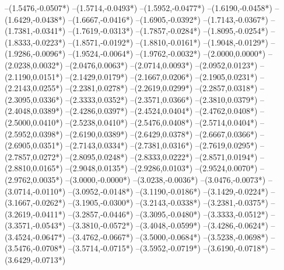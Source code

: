 {	--(1.5476,{-0.0507*\yskala})
	--(1.5714,{-0.0493*\yskala})
	--(1.5952,{-0.0477*\yskala})
	--(1.6190,{-0.0458*\yskala})
	--(1.6429,{-0.0438*\yskala})
	--(1.6667,{-0.0416*\yskala})
	--(1.6905,{-0.0392*\yskala})
	--(1.7143,{-0.0367*\yskala})
	--(1.7381,{-0.0341*\yskala})
	--(1.7619,{-0.0313*\yskala})
	--(1.7857,{-0.0284*\yskala})
	--(1.8095,{-0.0254*\yskala})
	--(1.8333,{-0.0223*\yskala})
	--(1.8571,{-0.0192*\yskala})
	--(1.8810,{-0.0161*\yskala})
	--(1.9048,{-0.0129*\yskala})
	--(1.9286,{-0.0096*\yskala})
	--(1.9524,{-0.0064*\yskala})
	--(1.9762,{-0.0032*\yskala})
	--(2.0000,{0.0000*\yskala})
	--(2.0238,{0.0032*\yskala})
	--(2.0476,{0.0063*\yskala})
	--(2.0714,{0.0093*\yskala})
	--(2.0952,{0.0123*\yskala})
	--(2.1190,{0.0151*\yskala})
	--(2.1429,{0.0179*\yskala})
	--(2.1667,{0.0206*\yskala})
	--(2.1905,{0.0231*\yskala})
	--(2.2143,{0.0255*\yskala})
	--(2.2381,{0.0278*\yskala})
	--(2.2619,{0.0299*\yskala})
	--(2.2857,{0.0318*\yskala})
	--(2.3095,{0.0336*\yskala})
	--(2.3333,{0.0352*\yskala})
	--(2.3571,{0.0366*\yskala})
	--(2.3810,{0.0379*\yskala})
	--(2.4048,{0.0389*\yskala})
	--(2.4286,{0.0397*\yskala})
	--(2.4524,{0.0404*\yskala})
	--(2.4762,{0.0408*\yskala})
	--(2.5000,{0.0410*\yskala})
	--(2.5238,{0.0410*\yskala})
	--(2.5476,{0.0408*\yskala})
	--(2.5714,{0.0404*\yskala})
	--(2.5952,{0.0398*\yskala})
	--(2.6190,{0.0389*\yskala})
	--(2.6429,{0.0378*\yskala})
	--(2.6667,{0.0366*\yskala})
	--(2.6905,{0.0351*\yskala})
	--(2.7143,{0.0334*\yskala})
	--(2.7381,{0.0316*\yskala})
	--(2.7619,{0.0295*\yskala})
	--(2.7857,{0.0272*\yskala})
	--(2.8095,{0.0248*\yskala})
	--(2.8333,{0.0222*\yskala})
	--(2.8571,{0.0194*\yskala})
	--(2.8810,{0.0165*\yskala})
	--(2.9048,{0.0135*\yskala})
	--(2.9286,{0.0103*\yskala})
	--(2.9524,{0.0070*\yskala})
	--(2.9762,{0.0035*\yskala})
	--(3.0000,{-0.0000*\yskala})
	--(3.0238,{-0.0036*\yskala})
	--(3.0476,{-0.0073*\yskala})
	--(3.0714,{-0.0110*\yskala})
	--(3.0952,{-0.0148*\yskala})
	--(3.1190,{-0.0186*\yskala})
	--(3.1429,{-0.0224*\yskala})
	--(3.1667,{-0.0262*\yskala})
	--(3.1905,{-0.0300*\yskala})
	--(3.2143,{-0.0338*\yskala})
	--(3.2381,{-0.0375*\yskala})
	--(3.2619,{-0.0411*\yskala})
	--(3.2857,{-0.0446*\yskala})
	--(3.3095,{-0.0480*\yskala})
	--(3.3333,{-0.0512*\yskala})
	--(3.3571,{-0.0543*\yskala})
	--(3.3810,{-0.0572*\yskala})
	--(3.4048,{-0.0599*\yskala})
	--(3.4286,{-0.0624*\yskala})
	--(3.4524,{-0.0647*\yskala})
	--(3.4762,{-0.0667*\yskala})
	--(3.5000,{-0.0684*\yskala})
	--(3.5238,{-0.0698*\yskala})
	--(3.5476,{-0.0708*\yskala})
	--(3.5714,{-0.0715*\yskala})
	--(3.5952,{-0.0719*\yskala})
	--(3.6190,{-0.0718*\yskala})
	--(3.6429,{-0.0713*\yskala})
}
